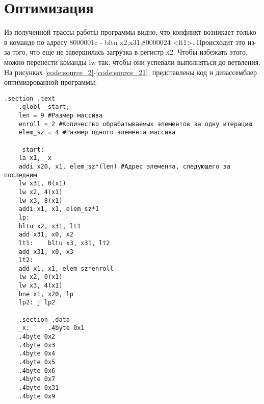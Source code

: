 \chapter{Оптимизация}

Из полученной трассы работы программы видно, что конфликт возникает только в команде по адресу $8000001$c - bltu x2,x31,80000024 <lt1>. Происходит это из-за того, что еще не завершилась загрузка в регистр x2. Чтобы избежать этого, можно перенести команды lw так, чтобы они успевали выполняться до ветвления. На рисунках \ref{code:source_2}-\ref{code:source_21}, представлены код и дизассемблер оптимизрованной программы.

\begin{lstlisting}[label=code:source_2, caption=Листинг оптимизрованной программы]
	.section .text
	.globl _start;
	len = 9 #Размер массива
	enroll = 2 #Количество обрабатываемых элементов за одну итерацию
	elem_sz = 4 #Размер одного элемента массива
	
	_start:
	la x1, _x
	addi x20, x1, elem_sz*(len) #Адрес элемента, следующего за последним
	lw x31, 0(x1)
	lw x2, 4(x1)
	lw x3, 8(x1)
	addi x1, x1, elem_sz*1
	lp:
	bltu x2, x31, lt1
	add x31, x0, x2
	lt1:    bltu x3, x31, lt2
	add x31, x0, x3
	lt2:
	add x1, x1, elem_sz*enroll
	lw x2, 0(x1)
	lw x3, 4(x1)
	bne x1, x20, lp
	lp2: j lp2
	
	.section .data
	_x:     .4byte 0x1
	.4byte 0x2
	.4byte 0x3
	.4byte 0x4
	.4byte 0x5
	.4byte 0x6
	.4byte 0x7
	.4byte 0x31
	.4byte 0x9
\end{lstlisting}


